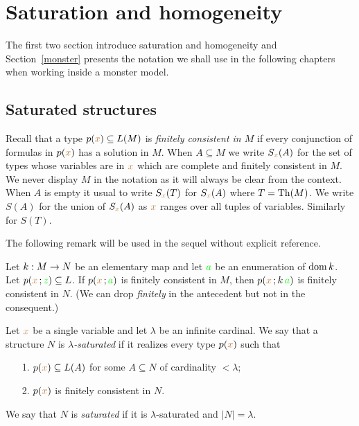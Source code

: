\documentclass[creche.tex]{subfiles}
\begin{document}
\chapter{Saturation and homogeneity}
\label{saturation}
 
\def\medrel#1{\parbox{6ex}{$\displaystyle\hfil #1$}}
\def\ceq#1#2#3{\parbox[b]{25ex}{$\displaystyle #1$}\medrel{#2}$\displaystyle  #3$}

The first two section introduce saturation and homogeneity and Section~\ref{monster} presents the notation we shall use in the following chapters when working inside a monster model.

\section{Saturated structures}\label{saturation_section}

Recall that a type $p({\color{brown} x})\subseteq L(M)$ is \emph{finitely consistent in $M$\/} if every conjunction of formulas in $p({\color{brown} x})$ has a solution in $M$.
%
When $A\subseteq M$ we write $S_{\color{brown} x}(A)$ for the set of types whose variables are in ${\color{brown} x}$ which are complete and finitely consistent in $M$.
We never display $M$ in the notation as it will always be clear from the context.
When $A$ is empty it usual to write $S_{\color{brown} x}(T)$ for $S_{\color{brown} x}(A)$ where $T={\rm Th}(M)$.
We write $S(A)$ for the union of $S_{\color{brown} x}(A)$ as ${\color{brown} x}$ ranges over all tuples of variables. Similarly for $S(T)$.

The following remark will be used in the sequel without explicit reference.

\begin{remark}
Let $k:M\rightarrow N$ be an elementary map and let ${\color{green} a}$ be an enumeration of $\mathop{\rm dom} k$. Let $p({\color{brown} x}\,;{\color{green} z})\subseteq L$. If $p({\color{brown} x}\,;{\color{green} a})$ is finitely consistent in $M$, then $p({\color{brown} x}\,;k\,{\color{green} a})$ is finitely consistent in $N$. (We can drop \textit{finitely} in the antecedent but not in the consequent.)\QED
\end{remark}

\begin{definition}\label{def_saturation}
Let ${\color{brown} x}$ be a single variable and let $\lambda$ be an infinite cardinal. We say that a structure $N$ is \emph{$\lambda$-saturated} if it realizes every type $p({\color{brown} x})$ such that
\begin{itemize}
\item[1.] $p({\color{brown} x})\subseteq L(A)$ for some $A\subseteq N$ of cardinality $<\lambda$;
\item[2.] $p({\color{brown} x})$ is finitely consistent in $N$.
\end{itemize}
We say that $N$ is \emph{saturated\/} if it is $\lambda$-saturated and $|N|=\lambda$.
\end{definition}
\end{document}
